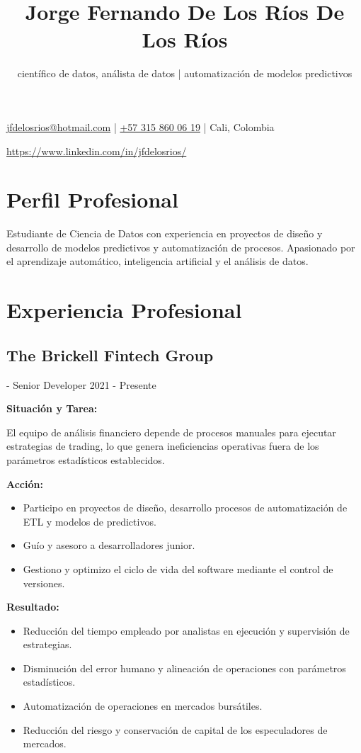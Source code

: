 \documentclass[letterpaper,12pt]{article}
\title{Jorge Fernando De Los Ríos De Los Ríos}
\author{científico de datos, análista de datos | automatización de modelos predictivos}
\date{}
\begin{document}
\justifying
\onehalfspacing

\maketitle

\href{mailto:jfdelosrios@hotmail.com}{jfdelosrios@hotmail.com} |
\href{tel:+573158600619}{+57 315 860 06 19} |
Cali, Colombia

\href{https://www.linkedin.com/in/jfdelosrios/}{https://www.linkedin.com/in/jfdelosrios/}

\section*{Perfil Profesional}

Estudiante de Ciencia de Datos  con experiencia en proyectos de diseño y desarrollo de modelos predictivos y automatización de procesos. Apasionado por el aprendizaje automático, inteligencia artificial y el análisis de datos.

\section*{Experiencia Profesional}

\subsection*{The Brickell Fintech Group} - Senior Developer \hfill 2021 - Presente

\textbf{Situación y Tarea:}

El equipo de análisis financiero depende de procesos manuales para ejecutar estrategias de trading, lo que genera ineficiencias operativas fuera de los parámetros estadísticos establecidos.

\textbf{Acción:}

\begin{itemize}
    \item Participo en proyectos de diseño, desarrollo procesos de automatización de ETL y modelos de predictivos.
    \item Guío y asesoro a desarrolladores junior.
    \item Gestiono y optimizo el ciclo de vida del software mediante el control de versiones.
\end{itemize}

\textbf{Resultado:}

\begin{itemize}
    \item Reducción del tiempo empleado por analistas en ejecución y supervisión de estrategias.
    \item Disminución del error humano y alineación de operaciones con parámetros estadísticos.
    \item Automatización de operaciones en mercados bursátiles.
    \item Reducción del riesgo y conservación de capital de los especuladores de mercados.
\end{itemize}
\end{document}
